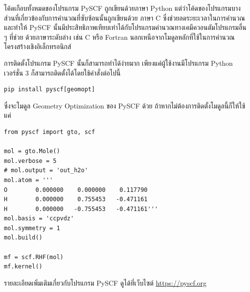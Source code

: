 โค้ดเกือบทั้งหมดของโปรแกรม PySCF ถูกเขียนด้วยภาษา Python แต่ว่าโค้ดของโปรแกรมบางส่วนที่เกี่ยวข้องกับการคำนวณที่ซับซ้อนนั้นถูกเขียนด้วย%
ภาษา C ซึ่งช่วยลดระยะเวลาในการคำนวณและทำให้ PySCF นั้นมีประสิทธิภาพเทียบเท่าได้กับโปรแกรมคำนวณทางเคมีควอนตัมโปรแกรมอื่น ๆ ที่ช่วย%
ด้วยภาษาระดับล่าง เช่น C หรือ Fortran นอกเหนือจากโมดูลหลักที่ใช้ในการคำนวณโครงสร้างเชิงอิเล็กทรอนิกส์

การติดตั้งโปรแกรม PySCF นั้นก็สามารถทำได้ง่ายมาก เพียงแค่ผู้ใช้งานมีโปรแกรม Python เวอร์ชั่น 3 ก็สามารถติดตั้งได้โดยใช้คำสั่งต่อไปนี้

\begin{lstlisting}[style=MyBash]
pip install pyscf[geomopt]
\end{lstlisting}

\vspace{1em}
\noindent ซึ่งจะโมดูล Geometry Optimization ของ PySCF ด้วย ถ้าหากไม่ต้องการติดตั้งโมดูลนี้ก็ให้ใช้แค่ 

\begin{lstlisting}[style=MyPython]
from pyscf import gto, scf

mol = gto.Mole()
mol.verbose = 5
# mol.output = 'out_h2o'
mol.atom = '''
O        0.000000    0.000000    0.117790
H        0.000000    0.755453   -0.471161
H        0.000000   -0.755453   -0.471161'''
mol.basis = 'ccpvdz'
mol.symmetry = 1
mol.build()

mf = scf.RHF(mol)
mf.kernel()
\end{lstlisting}

\vspace{1em}

รายละเอียดเพิ่มเติมเกี่ยวกับโปรแกรม PySCF ดูได้ที่เว็บไซต์ \url{https://pyscf.org}
